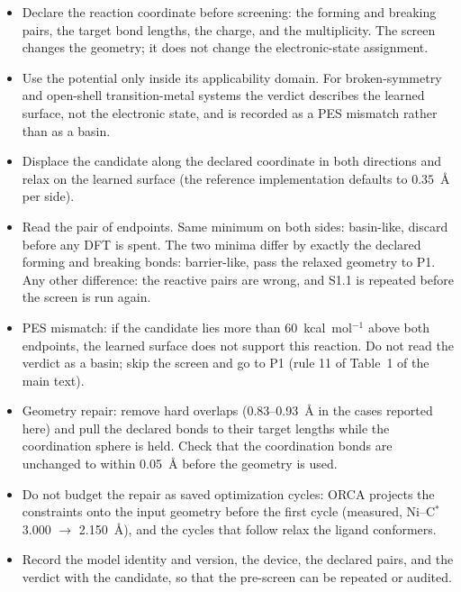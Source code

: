\documentclass[11pt,a4paper]{article}
\begin{document}
\begin{itemize}
\item Declare the reaction coordinate before screening: the forming and breaking pairs, the target bond lengths, the charge, and the multiplicity. The screen changes the geometry; it does not change the electronic-state assignment.
\item Use the potential only inside its applicability domain. For broken-symmetry and open-shell transition-metal systems the verdict describes the learned surface, not the electronic state, and is recorded as a PES mismatch rather than as a basin.
\item Displace the candidate along the declared coordinate in both directions and relax on the learned surface (the reference implementation defaults to $0.35$~\AA{} per side).
\item Read the pair of endpoints. Same minimum on both sides: basin-like, discard before any DFT is spent. The two minima differ by exactly the declared forming and breaking bonds: barrier-like, pass the relaxed geometry to P1. Any other difference: the reactive pairs are wrong, and S1.1 is repeated before the screen is run again.
\item PES mismatch: if the candidate lies more than 60~kcal~mol$^{-1}$ above both endpoints, the learned surface does not support this reaction. Do not read the verdict as a basin; skip the screen and go to P1 (rule 11 of Table~1 of the main text).
\item Geometry repair: remove hard overlaps (0.83--0.93~\AA{} in the cases reported here) and pull the declared bonds to their target lengths while the coordination sphere is held. Check that the coordination bonds are unchanged to within 0.05~\AA{} before the geometry is used.
\item Do not budget the repair as saved optimization cycles: ORCA projects the constraints onto the input geometry before the first cycle (measured, Ni--C$^*$ 3.000 $\rightarrow$ 2.150~\AA{}), and the cycles that follow relax the ligand conformers.
\item Record the model identity and version, the device, the declared pairs, and the verdict with the candidate, so that the pre-screen can be repeated or audited.
\end{itemize}
\end{document}
